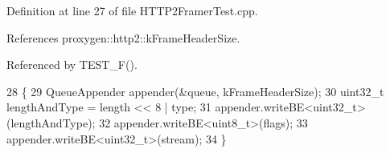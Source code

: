 Definition at line 27 of file H\+T\+T\+P2\+Framer\+Test.\+cpp.



References proxygen\+::http2\+::k\+Frame\+Header\+Size.



Referenced by T\+E\+S\+T\+\_\+\+F().


\begin{DoxyCode}
28                                                             \{
29   QueueAppender appender(&queue, kFrameHeaderSize);
30   uint32\_t lengthAndType = length << 8 | type;
31   appender.writeBE<uint32\_t>(lengthAndType);
32   appender.writeBE<uint8\_t>(flags);
33   appender.writeBE<uint32\_t>(stream);
34 \}
\end{DoxyCode}
